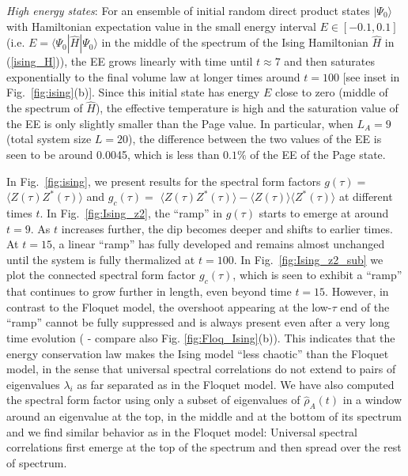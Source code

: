 \documentclass[aps,prb,preprint,onecolumn,amsmath,amssymb,superscriptaddress,eqsecnum,floatfix,scrartcl]{revtex4-1}
\begin{document}
{\it High energy states}:
 For an ensemble of
 initial random direct product states
$|\Psi_0\rangle$
 with Hamiltonian expectation value in the small  energy interval 
 $E\in[-0.1,0.1]$
 (i.e. $E=\langle \Psi_0| {\hat H}| \Psi_0\rangle$
in the middle of the spectrum of the Ising Hamiltonian ${\hat H }$ in (\ref{ising_H})),  
the EE grows linearly with time until 
$t \approx 7$ and  then saturates
exponentially to
the final  volume law 
 at  longer times around $t=100$ [see inset in Fig.~\ref{fig:ising}(b)].
Since this initial  state has energy $E$ close to zero
(middle of the spectrum of ${\hat H}$), the effective temperature is high and the saturation value of the EE is
only  slightly smaller than the Page value.  
In particular,  when $L_A=9$ (total system size $L=20$), the  difference between 
the two values of the EE
 is seen to be around 0.0045, which is less than $0.1\%$ of the  EE of the Page state.

In Fig.~\ref{fig:ising}, we present
results for 
the spectral form factors $g(\tau)=$ $\langle Z(\tau)Z^*(\tau)\rangle$ and 
$g_c(\tau)=$ $\langle Z(\tau)Z^*(\tau)\rangle-\langle Z(\tau)\rangle\langle Z^*(\tau)\rangle$ at 
different 
times $t$.
In Fig.~\ref{fig:Ising_z2}, the ``ramp''  in $g(\tau)$ starts to
emerge at around $t=9$. As $t$ increases further, the dip becomes deeper and shifts to 
earlier times. At $t=15$, a linear ``ramp'' has fully  developed and
 remains almost  unchanged until the system is fully thermalized at  $t=100$.
In Fig.~\ref{fig:Ising_z2_sub} we plot the
connected spectral form factor $g_c(\tau)$, which is seen to exhibit a ``ramp'' that continues to grow further in length, even beyond time $t=15$.
However, in contrast to  the Floquet model,  the
overshoot appearing at the low-$\tau$ end of the ``ramp''
cannot be fully suppressed and is always 
present even after a very
 long time evolution 
( - compare also
Fig. \ref{fig:Floq_Ising}(b)).
This   indicates that the energy conservation law makes the Ising model ``less chaotic'' than the Floquet model,
in the sense that universal spectral 
correlations do not extend to pairs of eigenvalues $\lambda_i$ as far separated as in the Floquet model.
We have also computed the 
spectral form factor  using only a subset  of eigenvalues of ${\hat \rho}_A(t)$ in a  window around an eigenvalue 
at the top, in the middle and at the bottom of its
spectrum
and we find similar behavior as 
 in the Floquet model:
Universal spectral 
correlations first 
emerge at the top
of the spectrum and then spread over the rest of spectrum.
\end{document}
